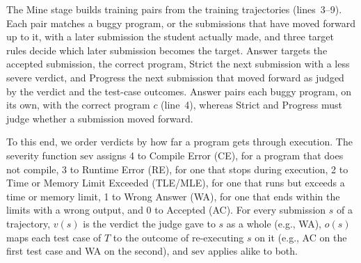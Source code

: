 \documentclass[conference]{IEEEtran}
\begin{document}
The Mine stage builds training pairs from the training trajectories (lines~3--9). Each pair matches a buggy program, or the submissions that have moved forward up to it, with a later submission the student actually made, and three target rules decide which later submission becomes the target. Answer targets the accepted submission, the correct program, Strict the next submission with a less severe verdict, and Progress the next submission that moved forward as judged by the verdict and the test-case outcomes. Answer pairs each buggy program, on its own, with the correct program \(c\) (line~4), whereas Strict and Progress must judge whether a submission moved forward.

To this end, we order verdicts by how far a program gets through execution. The severity function \(\mathrm{sev}\) assigns 4 to Compile Error (CE), for a program that does not compile, 3 to Runtime Error (RE), for one that stops during execution, 2 to Time or Memory Limit Exceeded (TLE/MLE), for one that runs but exceeds a time or memory limit, 1 to Wrong Answer (WA), for one that ends within the limits with a wrong output, and 0 to Accepted (AC). For every submission \(s\) of a trajectory, \(v(s)\) is the verdict the judge gave to \(s\) as a whole (e.g., WA), \(o(s)\) maps each test case of \(T\) to the outcome of re-executing \(s\) on it (e.g., AC on the first test case and WA on the second), and \(\mathrm{sev}\) applies alike to both.
\end{document}
